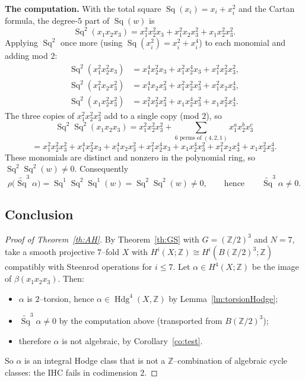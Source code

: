 \documentclass{article}
\newcommand{\Z}{{\mathbb{Z}}}
\DeclareMathOperator{\Sq}{Sq}
\DeclareMathOperator{\Hdg}{Hdg}
\begin{document}
\smallskip\noindent\textbf{The computation.} With the total square
$\Sq(x_i)=x_i+x_i^2$ and the Cartan formula, the degree‑$5$ part of $\Sq(w)$ is
\[
  \Sq^2(x_1x_2x_3)=x_1^2x_2^2x_3+x_1^2x_2x_3^2+x_1x_2^2x_3^2 .
\]
Applying $\Sq^2$ once more (using $\Sq(x_i^2)=x_i^2+x_i^4$) to each monomial and
adding mod $2$:
\[
\begin{aligned}
\Sq^2(x_1^2x_2^2x_3)&=x_1^4x_2^2x_3+x_1^2x_2^4x_3+x_1^2x_2^2x_3^2,\\
\Sq^2(x_1^2x_2x_3^2)&=x_1^4x_2x_3^2+x_1^2x_2^2x_3^2+x_1^2x_2x_3^4,\\
\Sq^2(x_1x_2^2x_3^2)&=x_1^2x_2^2x_3^2+x_1x_2^4x_3^2+x_1x_2^2x_3^4 .
\end{aligned}
\]
The three copies of $x_1^2x_2^2x_3^2$ add to a single copy (mod $2$), so
\[
  \boxed{\;\Sq^2\Sq^2(x_1x_2x_3)=x_1^2x_2^2x_3^2
  +\!\!\sum_{\text{$6$ perms of }(4,2,1)}\!\! x_1^{a}x_2^{b}x_3^{c}\;}
\]
\[
=x_1^2x_2^2x_3^2
+x_1^4x_2^2x_3+x_1^4x_2x_3^2+x_1^2x_2^4x_3+x_1x_2^4x_3^2+x_1^2x_2x_3^4+x_1x_2^2x_3^4 .
\]
These monomials are distinct and nonzero in the polynomial ring, so
$\Sq^2\Sq^2(w)\neq 0$. Consequently
\[
  \rho\big(\widetilde{\Sq}^3\alpha\big)=\Sq^1\Sq^2\Sq^1(w)=\Sq^2\Sq^2(w)\neq 0,
  \qquad\text{hence}\qquad \widetilde{\Sq}^3\alpha\neq 0 .
\]

\subsection{Conclusion}

\begin{proof}[Proof of Theorem~\ref{th:AH}]
By Theorem~\ref{th:GS} with $G=(\Z/2)^3$ and $N=7$, take a smooth projective
$7$--fold $X$ with $H^i(X;\Z)\cong H^i(B(\Z/2)^3;\Z)$ compatibly with Steenrod
operations for $i\le 7$. Let $\alpha\in H^4(X;\Z)$ be the image of
$\beta(x_1x_2x_3)$. Then:
\begin{itemize}
\item $\alpha$ is $2$--torsion, hence $\alpha\in\Hdg^4(X,\Z)$ by
Lemma~\ref{lm:torsionHodge};
\item $\widetilde{\Sq}^3\alpha\neq 0$ by the computation above (transported from
$B(\Z/2)^3$);
\item therefore $\alpha$ is not algebraic, by Corollary~\ref{co:test}.
\end{itemize}
So $\alpha$ is an integral Hodge class that is not a $\Z$--combination of
algebraic cycle classes: the IHC fails in codimension $2$.
\end{proof}
\end{document}
